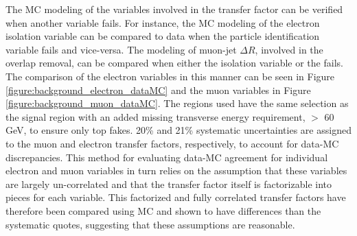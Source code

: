 The MC modeling of the variables involved in the transfer factor can be verified when another variable fails. For instance, the MC modeling of the electron isolation variable can be compared to data when the particle identification variable fails and vice-versa. The modeling of muon-jet $\Delta R$, involved in the overlap removal, can be compared when either the isolation variable or the \pt fails. The comparison of the electron variables in this manner can be seen in Figure \ref{figure:background_electron_dataMC} and the muon variables in Figure \ref{figure:background_muon_dataMC}. The regions used have the same selection as the signal region with an added missing transverse energy requirement, $>$ 60 GeV, to ensure only top fakes. 20\% and 21\% systematic uncertainties are assigned to the muon and electron transfer factors, respectively, to account for data-MC discrepancies. This method for evaluating data-MC agreement for individual electron and muon variables in turn relies on the assumption that these variables are largely un-correlated and that the transfer factor itself is factorizable into pieces for each variable. This factorized and fully correlated transfer factors have therefore been compared using MC and shown to have differences than the systematic quotes, suggesting that these assumptions are reasonable. 


